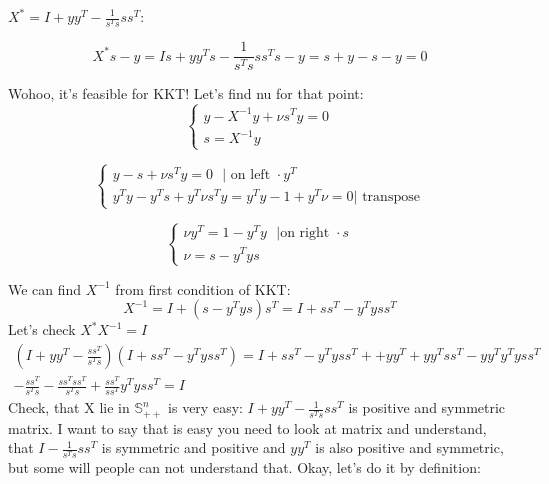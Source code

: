 $X^* = I + yy^T - \frac{1}{s^Ts}ss^T$:

\begin{equation*}
    X^*s - y = Is + yy^Ts - \frac{1}{s^Ts}ss^Ts - y = s + y - s - y = 0
\end{equation*}

Wohoo, it's feasible for KKT! Let's find nu for that point:
\begin{equation*}
\begin{cases}
    y - X^{-1}y + \nu s^T y = 0 \\
    s = X^{-1}y 
    \end{cases}
\end{equation*}

\begin{equation*}
    \begin{cases}
    y - s + \nu s^T y = 0 \text{ } | \text{ on left } \cdot y^T \\
    y^Ty - y^Ts + y^T \nu s^T y = y^Ty - 1 + y^T \nu = 0 | \text{ transpose}
    \end{cases}
\end{equation*}

\begin{equation*}
    \begin{cases}
        \nu y^T  = 1 - y^Ty \text{ } | \text{on right } \cdot s \\
        \nu = s - y^Tys
    \end{cases}
\end{equation*}

We can find $X^{-1}$ from first condition of KKT:
\begin{equation*}
    X^{-1} = I +(s-y^Tys)s^T = I + ss^T - y^Ty ss^T
\end{equation*}
Let's check $X^*X^{-1} = I$
\begin{equation*}
\begin{gathered}
    (I + yy^T - \frac{ss^T}{s^Ts})(I + ss^T - y^Ty ss^T) = 
    I + ss^T - y^Ty ss^T +
    + yy^T  +yy^T ss^T - yy^T y^Ty ss^T  \\
    - \frac{ss^T}{s^Ts} - \frac{ss^Tss^T}{s^Ts} + \frac{ss^T}{ss^T} y^Ty ss^T = I
\end{gathered}
\end{equation*}
Check, that X lie in $\mathds{S}_{++}^n$ is very easy: $I + yy^T - \frac{1}{s^Ts}ss^T$ is positive and symmetric matrix. I want to say that is easy you need to look at matrix and understand, that $I - \frac{1}{s^Ts}ss^T$ is symmetric and 
positive and $yy^T$ is also positive and symmetric, but some will people can not understand that. Okay, let's do it by definition:

